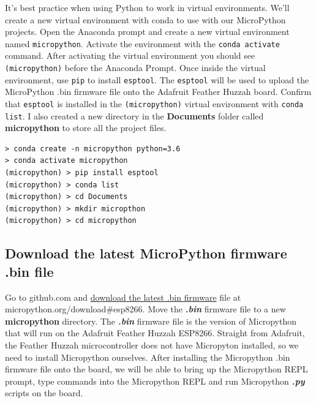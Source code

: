 \documentclass{book}
\begin{document}
    
        It's best practice when using Python to work in virtual environments.
We'll create a new virtual environment with conda to use with our
MicroPython projects. Open the Anaconda prompt and create a new virtual
environment named \lstinline!micropython!. Activate the environment with
the \lstinline!conda activate! command. After activating the virtual
environment you should see \lstinline!(micropython)! before the Anaconda
Prompt. Once inside the virtual environment, use \lstinline!pip! to
install \lstinline!esptool!. The \lstinline!esptool! will be used to
upload the MicroPython .bin firmware file onto the Adafruit Feather
Huzzah board. Confirm that \lstinline!esptool! is installed in the
\lstinline!(micropython)! virtual environment with
\lstinline!conda list!. I also created a new directory in the
\textbf{Documents} folder called \textbf{micropython} to store all the
project files.

\begin{lstlisting}
> conda create -n micropython python=3.6
> conda activate micropython
(micropython) > pip install esptool
(micropython) > conda list
(micropython) > cd Documents
(micropython) > mkdir micropthon
(micropython) > cd micropython
\end{lstlisting}
    




    
        \subsection{Download the latest MicroPython firmware .bin
file}\label{download-the-latest-micropython-firmware-.bin-file}
    




    
        Go to github.com and
\href{https://micropython.org/download\#esp8266}{download the latest
.bin firmware} file at micropython.org/download\#esp8266. Move the
\textbf{\emph{.bin}} firmware file to a new \textbf{micropython}
directory. The \textbf{\emph{.bin}} firmware file is the version of
Micropython that will run on the Adafruit Feather Huzzah ESP8266.
Straight from Adafruit, the Feather Huzzah microcontroller does not have
Micropyton installed, so we need to install Micropython ourselves. After
installing the Micropython .bin firmware file onto the board, we will be
able to bring up the Micropython REPL prompt, type commands into the
Micropython REPL and run Micropython \textbf{\emph{.py}} scripts on the
board.
\end{document}

